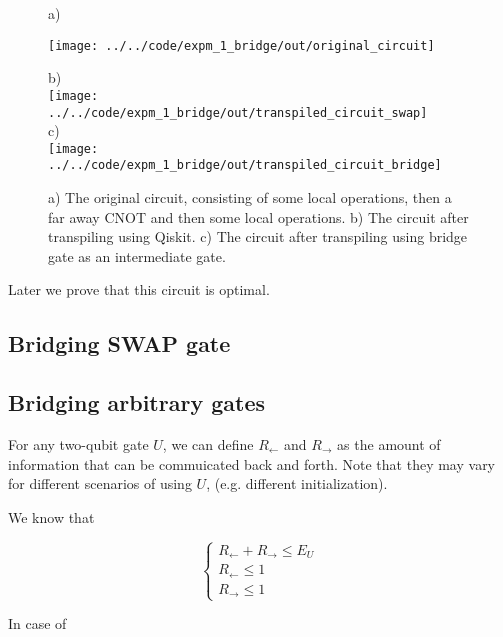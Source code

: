 \documentclass{article}
\begin{document}
  \begin{figure}[h]
    a) \\
    \begin{center}
    \texttt{[image: ../../code/expm\_1\_bridge/out/original\_circuit]}
    \end{center}
    b) \\
    \texttt{[image: ../../code/expm\_1\_bridge/out/transpiled\_circuit\_swap]} \\
    c) \\
    \texttt{[image: ../../code/expm\_1\_bridge/out/transpiled\_circuit\_bridge]}
    \caption{a) The original circuit, consisting of some local operations, then a far away CNOT and then some local operations. b) The circuit after transpiling using Qiskit. c) The circuit after transpiling using bridge gate as an intermediate gate.}
  \end{figure}

    Later we prove that this circuit is optimal.

\subsection*{Bridging SWAP gate}

\subsection*{Bridging arbitrary gates}

For any two-qubit gate $U$, we can define $R_\leftarrow$ and $R_\rightarrow$ as the amount of information that can be commuicated back and forth. Note that they may vary for different scenarios of using $U$, (e.g. different initialization).

We know that

\begin{equation}
  \begin{cases} 
    R_{\leftarrow} + R_{\rightarrow} \le E_U \\
    R_{\leftarrow} \le 1 \\
    R_{\rightarrow} \le 1
  \end{cases}
\end{equation}

In case of 
\end{document}
